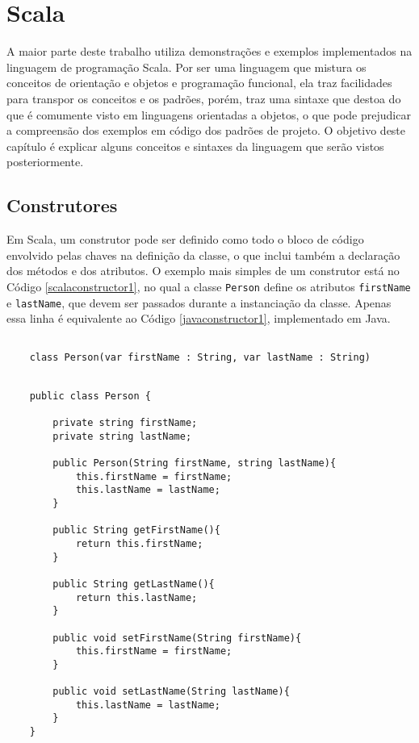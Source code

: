 \chapter{Scala}

A maior parte deste trabalho utiliza demonstrações 
e exemplos implementados na linguagem de programação Scala. 
Por ser uma linguagem que mistura os conceitos de 
orientação e objetos e programação funcional, ela traz 
facilidades para transpor os conceitos e os padrões, porém, 
traz uma sintaxe que destoa do que é comumente visto 
em linguagens orientadas a objetos, o que pode prejudicar 
a compreensão dos exemplos em código dos padrões de projeto. 
O objetivo deste capítulo é explicar alguns conceitos e 
sintaxes da linguagem que serão vistos posteriormente.


\section{Construtores}

Em Scala, um construtor pode ser definido como todo o 
bloco de código envolvido pelas chaves na definição da 
classe, o que inclui também a declaração dos métodos 
e dos atributos\cite{wampler2021}. O exemplo mais 
simples de um construtor 
está no Código \ref{scalaconstructor1}, no qual a classe 
\texttt{Person} define os atributos \texttt{firstName} e 
\texttt{lastName}, que 
devem ser passados durante a instanciação da classe. 
Apenas essa linha é equivalente ao Código \ref{javaconstructor1}, 
implementado em Java.

\begin{lstlisting}[caption={Construtor Simples em Scala.},label=scalaconstructor1]

    class Person(var firstName : String, var lastName : String)

\end{lstlisting}


\begin{lstlisting}[caption={Construtor Simples em Java.},label=javaconstructor1]

    public class Person {
        
        private string firstName;
        private string lastName;
        
        public Person(String firstName, string lastName){
            this.firstName = firstName;
            this.lastName = lastName;
        }
        
        public String getFirstName(){
            return this.firstName;
        }
        
        public String getLastName(){
            return this.lastName;
        }
        
        public void setFirstName(String firstName){
            this.firstName = firstName;
        }
        
        public void setLastName(String lastName){
            this.lastName = lastName;
        }
    }

\end{lstlisting}

